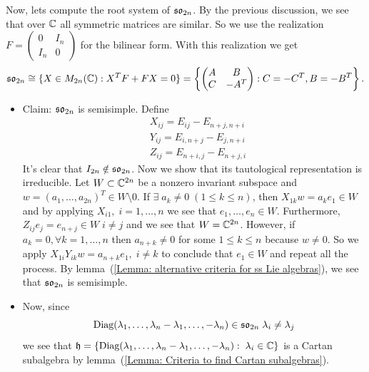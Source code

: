 Now, lets compute the root system of $\mathfrak{so}_{2n}$. By the previous discussion, we see that over $\mathbb{C}$ all symmetric matrices 
are similar. So we use the realization $F=\begin{pmatrix}0&I_n\\I_n&0\end{pmatrix}$ for the bilinear form. With this 
realization we get
\begin{equation}
    \mathfrak{so}_{2n}\cong\{X\in M_{2n}(\mathbb{C}): X^TF+F X=0\}
    =\left\{\begin{pmatrix}A&B\\C&-A^T\end{pmatrix}: C=-C^T, B=-B^T\right\}.
\end{equation}
\begin{itemize}
    \item Claim: $\mathfrak{so}_{2n}$ is semisimple. Define
    \begin{equation}
        \begin{split}
            &X_{ij}=E_{ij}-E_{n+j,n+i}\\
            &Y_{ij}=E_{i,n+j}-E_{j,n+i}\\
            &Z_{ij}=E_{n+i,j}-E_{n+j,i}
        \end{split}
    \end{equation}
    It's clear that $I_{2n}\notin \mathfrak{so}_{2n}$. Now we show that its tautological representation is irreducible. 
    Let $W\subset \mathbb{C}^{2n}$ be a nonzero invariant subspace and $w=(a_1,\dots,a_{2n})^T\in W\setminus0$. If 
    $\exists \;a_k\neq0\;(1\leq k\leq n)$, then $X_{1k}w=a_ke_1\in W$ and by applying $X_{i1},\;i=1,\dots, n$ we see that 
    $e_1,\dots, e_n\in W$. Furthermore, $Z_{ij}e_j=e_{n+j}\in W\;i\neq j$ and we see that $W=\mathbb{C}^{2n}$. However, if 
    $a_k=0,\forall k=1,\dots, n$ then $a_{n+k}\neq0$ for some $1\leq k\leq n$ because $w\neq0$. So we apply 
    $X_{1i}Y_{ik}w=a_{n+k} e_1,\; i\neq k$ to conclude that $e_1\in W$ and repeat all the process. By lemma~(\ref{Lemma: alternative criteria for ss Lie algebras}), 
    we see that $\mathfrak{so}_{2n}$ is semisimple. 
    \item  Now, since 
    \begin{equation}
        \text{Diag}(\lambda_1,\dots,\lambda_n-\lambda_1,\dots,-\lambda_n)\in\mathfrak{so}_{2n}\;\lambda_i\neq \lambda_j
    \end{equation}
    we see that $\mathfrak{h}=\{\text{Diag}(\lambda_1,\dots,\lambda_n-\lambda_1,\dots,-\lambda_n):\;\lambda_i\in\mathbb{C}\}$ is a 
    Cartan subalgebra by lemma~(\ref{Lemma: Criteria to find Cartan subalgebras}).

\end{itemize}
